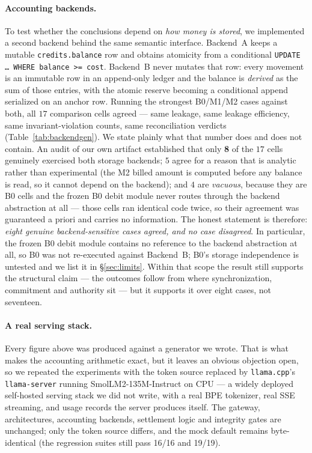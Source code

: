 \documentclass[11pt]{article}
\begin{document}
\paragraph{Accounting backends.} To test whether the conclusions depend on \emph{how money
is stored}, we implemented a second backend behind the same semantic interface. Backend~A
keeps a mutable \texttt{credits.balance} row and obtains atomicity from a conditional
\texttt{UPDATE {\ldots} WHERE balance >= cost}. Backend~B never mutates that row: every
movement is an immutable row in an append-only ledger and the balance is \emph{derived} as
the sum of those entries, with the atomic reserve becoming a conditional append serialized
on an anchor row. Running the strongest B0/M1/M2 cases against both, all $17$ comparison cells agreed
--- same leakage, same leakage efficiency, same invariant-violation counts, same
reconciliation verdicts (Table~\ref{tab:backendgen}). We state plainly what that number
does and does not contain. An audit of our own artifact established that only \textbf{8}
of the $17$ cells genuinely exercised both storage backends; $5$ agree for a reason that
is analytic rather than experimental (the M2 billed amount is computed before any balance
is read, so it cannot depend on the backend); and $4$ are \emph{vacuous}, because they are
B0 cells and the frozen B0 debit module never routes through the backend abstraction at
all --- those cells ran identical code twice, so their agreement was guaranteed a priori
and carries no information. The
honest statement is therefore: \emph{eight genuine backend-sensitive cases agreed, and no
case disagreed}. In particular, the frozen B0 debit module contains no reference to the
backend abstraction at all, so B0 was not re-executed against Backend~B; B0's storage
independence is untested and we list it in \S\ref{sec:limits}. Within that scope the
result still supports the structural claim --- the outcomes follow from where
synchronization, commitment and authority sit --- but it supports it over eight cases,
not seventeen.

\paragraph{A real serving stack.} Every figure above was produced against a generator we
wrote. That is what makes the accounting arithmetic exact, but it leaves an obvious
objection open, so we repeated the experiments with the token source replaced by
\texttt{llama.cpp}'s \texttt{llama-server} running SmolLM2-135M-Instruct on CPU --- a
widely deployed self-hosted serving stack we did not write, with a real BPE tokenizer,
real SSE streaming, and usage records the server produces itself. The gateway,
architectures, accounting backends, settlement logic and integrity gates are unchanged;
only the token source differs, and the mock default remains byte-identical (the regression
suites still pass 16/16 and 19/19).
\end{document}
